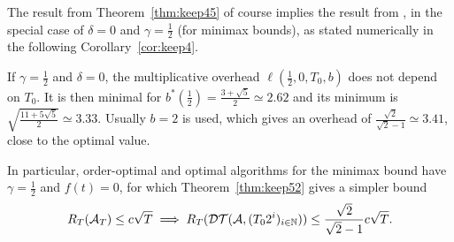 \documentclass[12pt]{colt2018} %
\begin{document}
The result from Theorem~\ref{thm:keep45} of course implies the result from \cite[Ex.2.9]{CesaLugosi06}, in the special case of $\delta=0$ and $\gamma=\frac{1}{2}$ (for minimax bounds),
as stated numerically in the following Corollary~\ref{cor:keep4}.

\begin{corollary}\label{cor:keep4}
    If $\gamma=\frac{1}{2}$ and $\delta=0$,
    the multiplicative overhead $\ell(\frac{1}{2}, 0, T_0, b)$ does not depend on $T_0$.
    It is then minimal for $b^*(\frac{1}{2}) = \frac{3 + \sqrt{5}}{2} \simeq 2.62$ and its minimum is $\sqrt{\frac{11 + 5 \sqrt{5}}{2}} \simeq 3.33$.
    Usually $b = 2$ is used, which gives an overhead of $\frac{\sqrt{2}}{\sqrt{2} - 1} \simeq 3.41$, close to the optimal value.


    In particular, order-optimal and optimal algorithms for the minimax bound
    have $\gamma=\frac{1}{2}$ and $f(t)=0$,
    for which Theorem~\ref{thm:keep52} gives a simpler bound
    \begin{equation}\label{eq:corkeep4_1}
        R_T(\mathcal{A}_T) \leq c \sqrt{T}
        \implies
        R_T(\mathcal{DT}(\mathcal{A}, (T_0 2^i)_{i\in\mathbb{N}})) \leq \frac{\sqrt{2}}{\sqrt{2} - 1} c \sqrt{T}.
    \end{equation}
\end{corollary}





\end{document}
